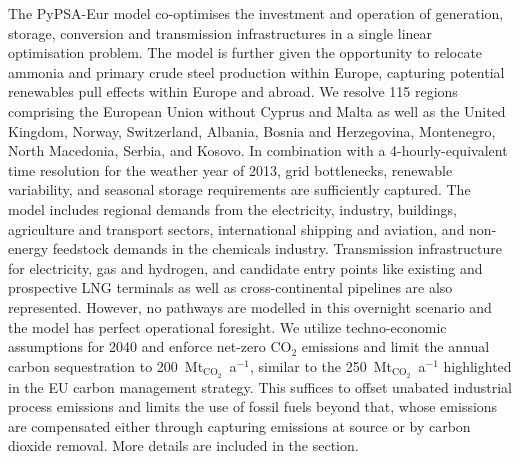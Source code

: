 The PyPSA-Eur\cite{PyPSAEurSecSectorCoupledOpen} model co-optimises the investment
and operation of generation, storage, conversion and transmission
infrastructures in a single linear optimisation problem. The model is further
given the opportunity to relocate ammonia and primary crude steel production within
Europe, capturing potential renewables pull effects within Europe and
abroad.\cite{verpoortImpactGlobalHeterogeneity2024,
samadiRenewablesPullEffect2023,egererIndustryTransformationFossil2024} We
resolve 115 regions comprising the European Union without Cyprus and Malta as
well as the United Kingdom, Norway, Switzerland, Albania, Bosnia and
Herzegovina, Montenegro, North Macedonia, Serbia, and Kosovo. In combination
with a 4-hourly-equivalent time resolution for the weather year of 2013, grid
bottlenecks, renewable variability, and seasonal storage requirements are
sufficiently captured. The  model includes regional demands from the
electricity, industry, buildings, agriculture and transport sectors,
international shipping and aviation, and non-energy feedstock demands in the
chemicals industry. Transmission infrastructure for electricity, gas and
hydrogen, and candidate entry points like existing and prospective LNG terminals
as well as cross-continental pipelines are also represented.  However, no
pathways are modelled in this overnight scenario and the model has perfect
operational foresight. We utilize techno-economic assumptions for 2040 and
enforce net-zero CO$_2$ emissions and limit the annual carbon sequestration to
200~Mt$_{\text{CO}_2}$~a$^{-1}$, similar to the 250~Mt$_{\text{CO}_2}$~a$^{-1}$
highlighted in the EU carbon management
strategy.\cite{europeancommissionAmbitiousIndustrialCarbon2024} This suffices to
offset unabated industrial process emissions and limits the use of fossil fuels
beyond that, whose emissions are compensated either through capturing emissions
at source or by carbon dioxide removal. More details are included in the
 section.
